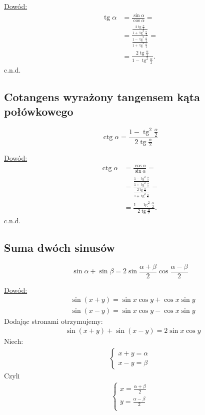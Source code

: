 \documentclass[12pt,a4paper,fleqn]{article}
\DeclareMathOperator{\tg}{tg}
\DeclareMathOperator{\ctg}{ctg}
\begin{document}
		\underline{Dowód:} \noindent
		\begin{align*}
			\tg\alpha &= \frac{\sin\alpha}{\cos\alpha} = \\
					  &= \frac{\frac{2\tg\frac{\alpha}{2}}{1+\tg^2\frac{\alpha}{2}}}{\frac{1-\tg^2\frac{\alpha}{2}}{1+\tg^2\frac{\alpha}{2}}} =\\
					  &=\frac{2\tg\frac{\alpha}{2}}{1-\tg^2\frac{\alpha}{2}}.
		\end{align*}
		c.n.d.
	\subsection{Cotangens wyrażony tangensem kąta połówkowego}
		\begin{equation*}
			\ctg\alpha = \frac{1-\tg^2\frac{\alpha}{2}}{2\tg\frac{\alpha}{2}}
		\end{equation*}
		
		\underline{Dowód:} \noindent
		\begin{align*}
			\ctg\alpha &= \frac{\cos\alpha}{\sin\alpha} = \\
					   &= \frac{\frac{1-\tg^2\frac{\alpha}{2}}{1+\tg^2\frac{\alpha}{2}}}{\frac{2\tg\frac{\alpha}{2}}{1+\tg^2\frac{\alpha}{2}}} =\\
					   &= \frac{1-\tg^2\frac{\alpha}{2}}{2\tg\frac{\alpha}{2}}.
		\end{align*}
		c.n.d.
		
	\subsection{Suma dwóch sinusów}
		\begin{equation*}
			\sin\alpha + \sin \beta =2\sin\frac{\alpha+\beta}{2}\cos\frac{\alpha-\beta}{2} 
		\end{equation*}
		
		\underline{Dowód:} \noindent
		\begin{align*}
			&\sin(x+y) = \sin x \cos y + \cos x \sin y\\
			&\sin(x-y) = \sin x \cos y - \cos x \sin y
		\end{align*}
			Dodając stronami otrzymujemy:
		\begin{align*}
			&\sin(x+y) + \sin(x-y) = 2\sin x \cos y
		\end{align*}
		Niech:
		\begin{align*}
		\begin{cases}
			x+y = \alpha\\
			x-y = \beta
		\end{cases}
		\end{align*}
		Czyli
		\begin{align*}
		\begin{cases}
		 	x = \frac{\alpha+\beta}{2}\\
		 	y = \frac{\alpha-\beta}{2}\\
		\end{cases}
		\end{align*}
		
\end{document}
